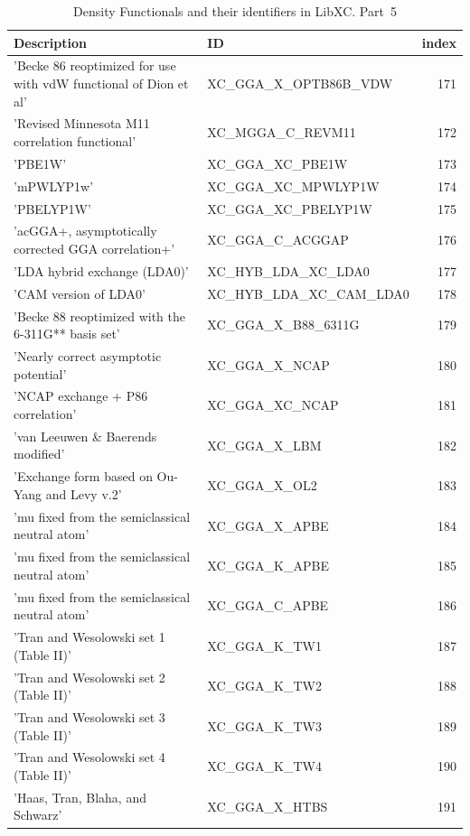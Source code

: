 \documentclass[final,12pt,makeidx,DIV=calc]{article}
\begin{document}
{{{{{{\begin{table}[!h]
\caption{Density Functionals and their identifiers in LibXC. Part~5}
\begin{center}
\begin{tabular}{llr}
\hline
\hline
Description & ID & index\\
\hline
  'Becke 86 reoptimized for use with vdW functional of Dion et al' & XC\_GGA\_X\_OPTB86B\_VDW  &171\\
  'Revised Minnesota M11 correlation functional' & XC\_MGGA\_C\_REVM11  &172\\
  'PBE1W' & XC\_GGA\_XC\_PBE1W  &173\\
  'mPWLYP1w' & XC\_GGA\_XC\_MPWLYP1W  &174\\
  'PBELYP1W' & XC\_GGA\_XC\_PBELYP1W  &175\\
  'acGGA+, asymptotically corrected GGA correlation+' & XC\_GGA\_C\_ACGGAP  &176\\
  'LDA hybrid exchange (LDA0)' & XC\_HYB\_LDA\_XC\_LDA0  &177\\
  'CAM version of LDA0' & XC\_HYB\_LDA\_XC\_CAM\_LDA0  &178\\
  'Becke 88 reoptimized with the 6-311G** basis set' & XC\_GGA\_X\_B88\_6311G  &179\\
  'Nearly correct asymptotic potential' & XC\_GGA\_X\_NCAP  &180\\
  'NCAP exchange + P86 correlation' & XC\_GGA\_XC\_NCAP  &181\\
  'van Leeuwen \& Baerends modified' & XC\_GGA\_X\_LBM  &182\\
  'Exchange form based on Ou-Yang and Levy v.2' & XC\_GGA\_X\_OL2  &183\\
  'mu fixed from the semiclassical neutral atom' & XC\_GGA\_X\_APBE  &184\\
  'mu fixed from the semiclassical neutral atom' & XC\_GGA\_K\_APBE  &185\\
  'mu fixed from the semiclassical neutral atom' & XC\_GGA\_C\_APBE  &186\\
  'Tran and Wesolowski set 1 (Table II)' & XC\_GGA\_K\_TW1  &187\\
  'Tran and Wesolowski set 2 (Table II)' & XC\_GGA\_K\_TW2  &188\\
  'Tran and Wesolowski set 3 (Table II)' & XC\_GGA\_K\_TW3  &189\\
  'Tran and Wesolowski set 4 (Table II)' & XC\_GGA\_K\_TW4  &190\\
  'Haas, Tran, Blaha, and Schwarz' & XC\_GGA\_X\_HTBS  &191\\

\end{tabular}
\end{center}
\end{table}}}}}}}
\end{document}
